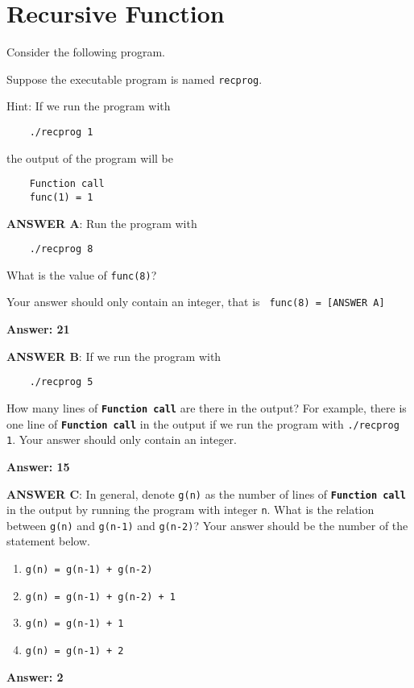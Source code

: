 \newpage
\section{Recursive Function}

Consider the following program.

\resetlinenumber[1]
\linenumbers
\begin{tt}
  
\end{tt}
\nolinenumbers

Suppose the executable program is named {\tt recprog}.

Hint: If we run the program with
\begin{verbatim}
	./recprog 1
\end{verbatim}
the output of the program will be
\begin{verbatim}
	Function call
	func(1) = 1
\end{verbatim}

{\bf ANSWER A}: Run the program with  
\begin{verbatim}
	./recprog 8
\end{verbatim}
What is the value of \texttt{func(8)}?

Your answer should only contain an integer, that is 
\texttt{
	func(8) = [ANSWER A]
}

\ifexam

\else

{\bf Answer: 21}

\fi


{\bf ANSWER B}: If we run the program with  
\begin{verbatim}
	./recprog 5
\end{verbatim}
How many lines of {\tt\bf Function call} are there in the output? For example, there is one line of {\tt\bf Function call} in the output if we run the program with \texttt{./recprog 1}. Your answer should only contain an integer.

\ifexam

\else

{\bf Answer: 15}

\fi


{\bf ANSWER C}: In general, denote \texttt{g(n)} as the number of lines of {\tt\bf Function call} in the output by running the program with integer \texttt{n}. What is the relation between \texttt{g(n)} and \texttt{g(n-1)} and \texttt{g(n-2)}? Your answer should be the number of the statement below.

\begin{enumerate}
\item \texttt{g(n) = g(n-1) + g(n-2)}
\item \texttt{g(n) = g(n-1) + g(n-2) + 1}
\item \texttt{g(n) = g(n-1) + 1}
\item \texttt{g(n) = g(n-1) + 2}
\end{enumerate}

\ifexam

\else

{\bf Answer: 2}

\fi